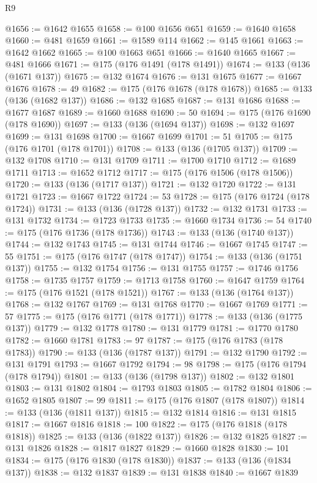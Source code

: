 \begin{lexlean}{R9}
\begin{coremodule}
{{{{{{{{{{{{{{{{{{{{{{{{{{{{{{{{{{{{{{{{{{{{{{{{{{{{{{{{{{{{{{{{{{{{{{{{{{{{{{{{{{{{{{{{{{{{{{{{{{{{{{{{{{{{@1656 := @1642 @1655
@1658 := @100 @1656 @651
@1659 := @1640 @1658
@1660 := @481 @1659
@1661 := @1589 @114
@1662 := @145 @1661
@1663 := @1642 @1662
@1665 := @100 @1663 @651
@1666 := @1640 @1665
@1667 := @481 @1666
@1671 := @175 (@176 @1491 (@178 @1491))
@1674 := @133 (@136 (@1671 @137))
@1675 := @132 @1674
@1676 := @131 @1675
@1677 := @1667 @1676
@1678 := 49
@1682 := @175 (@176 @1678 (@178 @1678))
@1685 := @133 (@136 (@1682 @137))
@1686 := @132 @1685
@1687 := @131 @1686
@1688 := @1677 @1687
@1689 := @1660 @1688
@1690 := 50
@1694 := @175 (@176 @1690 (@178 @1690))
@1697 := @133 (@136 (@1694 @137))
@1698 := @132 @1697
@1699 := @131 @1698
@1700 := @1667 @1699
@1701 := 51
@1705 := @175 (@176 @1701 (@178 @1701))
@1708 := @133 (@136 (@1705 @137))
@1709 := @132 @1708
@1710 := @131 @1709
@1711 := @1700 @1710
@1712 := @1689 @1711
@1713 := @1652 @1712
@1717 := @175 (@176 @1506 (@178 @1506))
@1720 := @133 (@136 (@1717 @137))
@1721 := @132 @1720
@1722 := @131 @1721
@1723 := @1667 @1722
@1724 := 53
@1728 := @175 (@176 @1724 (@178 @1724))
@1731 := @133 (@136 (@1728 @137))
@1732 := @132 @1731
@1733 := @131 @1732
@1734 := @1723 @1733
@1735 := @1660 @1734
@1736 := 54
@1740 := @175 (@176 @1736 (@178 @1736))
@1743 := @133 (@136 (@1740 @137))
@1744 := @132 @1743
@1745 := @131 @1744
@1746 := @1667 @1745
@1747 := 55
@1751 := @175 (@176 @1747 (@178 @1747))
@1754 := @133 (@136 (@1751 @137))
@1755 := @132 @1754
@1756 := @131 @1755
@1757 := @1746 @1756
@1758 := @1735 @1757
@1759 := @1713 @1758
@1760 := @1647 @1759
@1764 := @175 (@176 @1521 (@178 @1521))
@1767 := @133 (@136 (@1764 @137))
@1768 := @132 @1767
@1769 := @131 @1768
@1770 := @1667 @1769
@1771 := 57
@1775 := @175 (@176 @1771 (@178 @1771))
@1778 := @133 (@136 (@1775 @137))
@1779 := @132 @1778
@1780 := @131 @1779
@1781 := @1770 @1780
@1782 := @1660 @1781
@1783 := 97
@1787 := @175 (@176 @1783 (@178 @1783))
@1790 := @133 (@136 (@1787 @137))
@1791 := @132 @1790
@1792 := @131 @1791
@1793 := @1667 @1792
@1794 := 98
@1798 := @175 (@176 @1794 (@178 @1794))
@1801 := @133 (@136 (@1798 @137))
@1802 := @132 @1801
@1803 := @131 @1802
@1804 := @1793 @1803
@1805 := @1782 @1804
@1806 := @1652 @1805
@1807 := 99
@1811 := @175 (@176 @1807 (@178 @1807))
@1814 := @133 (@136 (@1811 @137))
@1815 := @132 @1814
@1816 := @131 @1815
@1817 := @1667 @1816
@1818 := 100
@1822 := @175 (@176 @1818 (@178 @1818))
@1825 := @133 (@136 (@1822 @137))
@1826 := @132 @1825
@1827 := @131 @1826
@1828 := @1817 @1827
@1829 := @1660 @1828
@1830 := 101
@1834 := @175 (@176 @1830 (@178 @1830))
@1837 := @133 (@136 (@1834 @137))
@1838 := @132 @1837
@1839 := @131 @1838
@1840 := @1667 @1839
}}}}}}}}}}}}}}}}}}}}}}}}}}}}}}}}}}}}}}}}}}}}}}}}}}}}}}}}}}}}}}}}}}}}}}}}}}}}}}}}}}}}}}}}}}}}}}}}}}}}}}}}}}}}
\end{coremodule}
\end{lexlean}
